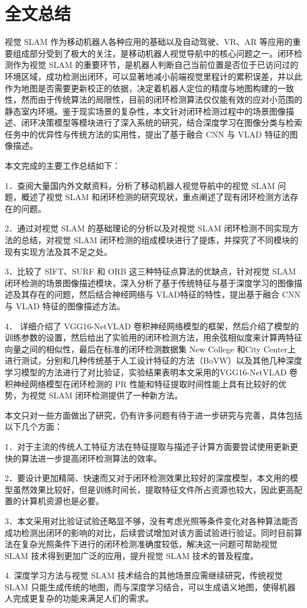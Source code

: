 \chapter{全文总结}
视觉 SLAM 作为移动机器人各种应用的基础以及自动驾驶、VR、AR 等应用的重要组成部分受到了极大的关注，是移动机器人视觉导航中的核心问题之一。闭环检测作为视觉 SLAM 的重要环节，是机器人判断自己当前位置是否位于已访问过的环境区域，成功检测出闭环，可以显著地减小前端视觉里程计的累积误差，并以此作为地图是否需要更新校正的依据，决定着机器人定位的精度与地图构建的一致性，然而由于传统算法的局限性，目前的闭环检测算法仅仅能有效的应对小范围的静态室内环境。鉴于现实场景的复杂性，本文针对闭环检测过程中的场景图像描述、闭环决策模型等模块进行了深入系统的研究，结合深度学习在图像分类与检索任务中的优异性与传统方法的实用性，提出了基于融合 CNN 与 VLAD 特征的图像描述。

本文完成的主要工作总结如下：

1．查阅大量国内外文献资料，分析了移动机器人视觉导航中的视觉 SLAM 问题，概述了视觉 SLAM 和闭环检测的研究现状，重点阐述了现有闭环检测方法存在的问题。

2．通过对视觉 SLAM 的基础理论的分析以及对视觉 SLAM 闭环检测不同实现方法的总结，对视觉 SLAM 闭环检测的组成模块进行了提炼，并探究了不同模块的现有实现方法及其不足之处。

3．比较了 SIFT、SURF 和 ORB 这三种特征点算法的优缺点，针对视觉 SLAM 闭环检测的场景图像描述模块，深入分析了基于传统特征与基于深度学习的图像描述及其存在的问题，然后结合神经网络与 VLAD特征的特性，提出基于融合 CNN 与 VLAD 特征的图像描述方法。

4．
详细介绍了 VGG16-NetVLAD 卷积神经网络模型的框架，然后介绍了模型的训练参数的设置，然后给出了实验用的闭环检测方法，用余弦相似度来计算两特征向量之间的相似性，最后在标准的闭环检测数据集 New College 和City Center上进行测试，分别和几种传统基于人工设计特征的方法（BoVW）以及其他几种深度学习模型的方法进行了对比验证，实验结果表明本文采用的VGG16-NetVLAD 卷积神经网络模型在闭环检测的 PR 性能和特征提取时间性能上具有比较好的优势，为视觉 SLAM 闭环检测提供了一种新方法。

本文只对一些方面做出了研究，仍有许多问题有待于进一步研究与完善，具体包括以下几个方面： 

1．对于主流的传统人工特征方法在特征提取与描述子计算方面要尝试使用更新更快的算法进一步提高闭环检测算法的效率。 

2．要设计更加精简、快速而又对于闭环检测效果比较好的深度模型，本文用的模型虽然效果比较好，但是训练时间长，提取特征文件所占资源也较大，因此更高配置的计算机资源也是必要。

3．本文采用对比验证试验还略显不够，没有考虑光照等条件变化对各种算法能否成功检测出闭环的影响的对比，后续尝试增加对该方面试验进行验证。同时目前算法在复杂光照条件下进行的闭环检测准确度较低，解决这一问题可帮助视觉 SLAM 技术得到更加广泛的应用，提升视觉 SLAM 技术的普及程度。

4. 深度学习方法与视觉 SLAM 技术结合的其他场景应需继续研究，传统视觉 SLAM 只能生成传统的地图，而与深度学习结合，可以生成语义地图，使得机器人完成更复杂的功能来满足人们的需求。


\endinput